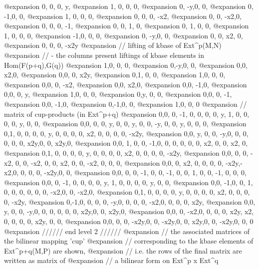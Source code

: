@expansion{} 0, 0, 0,  y,  
@expansion{} 1, 0, 0,  0,  
@expansion{} 0, -y,0,  0,  
@expansion{} 0, -1,0,  0,  
@expansion{} 1, 0, 0,  0,  
@expansion{} 0, 0, 0,  -x2,
@expansion{} 0, 0, -x2,0,  
@expansion{} 0, 0, 0,  -1, 
@expansion{} 0, 0, 1,  0,  
@expansion{} 0, 1, 0,  0,  
@expansion{} 1, 0, 0,  0,  
@expansion{} -1,0, 0,  0,  
@expansion{} 0, -y,0,  0,  
@expansion{} 0, 0, x2, 0,  
@expansion{} 0, 0, 0,  -x2y
@expansion{} // lifting of kbase of Ext^p(M,N)
@expansion{} //  - the columns present liftings of kbase elements in Hom(F(p+q),G(q))
@expansion{} 1,0, 0, 0,  
@expansion{} 0,-y,0, 0,  
@expansion{} 0,0, x2,0,  
@expansion{} 0,0, 0, x2y,
@expansion{} 0,1, 0, 0,  
@expansion{} 1,0, 0, 0,  
@expansion{} 0,0, 0, -x2,
@expansion{} 0,0, x2,0,  
@expansion{} 0,0, -1,0,  
@expansion{} 0,0, 0, y,  
@expansion{} 1,0, 0, 0,  
@expansion{} 0,y, 0, 0,  
@expansion{} 0,0, 0, -1, 
@expansion{} 0,0, -1,0,  
@expansion{} 0,-1,0, 0,  
@expansion{} 1,0, 0, 0   
@expansion{} // matrix of cup-products (in Ext^p+q)
@expansion{} 0,0, 0, -1, 0,   0, 0, 0,   y,   1,  0,  0,  0,  0,   y,   0,  0,   
@expansion{} 0,0, 0, 0,  y,   0, 0, y,   0,   0,  -y, 0,  0,  y,   0,   0,  0,   
@expansion{} 0,1, 0, 0,  0,   0, y, 0,   0,   0,  0,  x2, 0,  0,   0,   0,  -x2y,
@expansion{} 0,0, y, 0,  0,   -y,0, 0,   0,   0,  0,  0,  x2y,0,   0,   x2y,0,   
@expansion{} 0,0, 1, 0,  0,   -1,0, 0,   0,   0,  0,  0,  x2, 0,   0,   x2, 0,   
@expansion{} 0,1, 0, 0,  0,   0, y, 0,   0,   0,  0,  x2, 0,  0,   0,   0,  -x2y,
@expansion{} 0,0, 0, 0,  -x2, 0, 0, -x2, 0,   0,  x2, 0,  0,  -x2, 0,   0,  0,   
@expansion{} 0,0, 0, x2, 0,   0, 0, 0,   -x2y,-x2,0,  0,  0,  0,   -x2y,0,  0,   
@expansion{} 0,0, 0, 0,  -1,  0, 0, -1,  0,   0,  1,  0,  0,  -1,  0,   0,  0,   
@expansion{} 0,0, 0, -1, 0,   0, 0, 0,   y,   1,  0,  0,  0,  0,   y,   0,  0,   
@expansion{} 0,0, -1,0,  0,   1, 0, 0,   0,   0,  0,  0,  -x2,0,   0,   -x2,0,   
@expansion{} 0,1, 0, 0,  0,   0, y, 0,   0,   0,  0,  x2, 0,  0,   0,   0,  -x2y,
@expansion{} 0,-1,0, 0,  0,   0, -y,0,   0,   0,  0,  -x2,0,  0,   0,   0,  x2y, 
@expansion{} 0,0, y, 0,  0,   -y,0, 0,   0,   0,  0,  0,  x2y,0,   0,   x2y,0,   
@expansion{} 0,0, 0, -x2,0,   0, 0, 0,   x2y, x2, 0,  0,  0,  0,   x2y, 0,  0,   
@expansion{} 0,0, 0, 0,  -x2y,0, 0, -x2y,0,   0,  x2y,0,  0,  -x2y,0,   0,  0    
@expansion{} ////// end level 2 //////
@expansion{} // the associated matrices of the bilinear mapping 'cup' 
@expansion{} // corresponding to the kbase elements of Ext^p+q(M,P) are shown,
@expansion{} //  i.e. the rows of the final matrix are written as matrix of
@expansion{} //  a bilinear form on Ext^p x Ext^q

